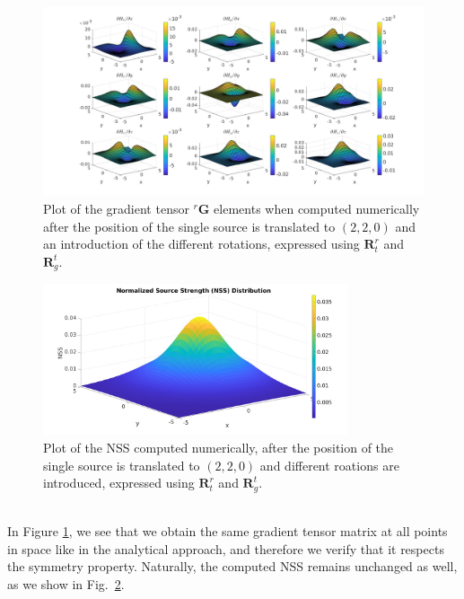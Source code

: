 \documentclass[main]{subfiles}
\begin{document}
\begin{figure}
\centering
\hspace*{-0.2\textwidth}
\includegraphics[width=1.4\textwidth]{images/gradients_rotated_single_num.jpg}
\caption{Plot of the gradient tensor ${}^r \mathbf{G}$ elements
when computed numerically after the position of the single source is translated to $(2,2,0)$ and an 
introduction of the different rotations, expressed using $\mathbf{R}^r_t$ and $\mathbf{R}_g^t$.}
\label{fig:gradients_rotated_single_num}
\end{figure}
\begin{figure}
\centering
\includegraphics[width=0.8\textwidth]{images/NSS_rotated_single_num.jpg}
\caption{Plot of the NSS computed numerically, after the position of the single source is translated to $(2,2,0)$ and 
different roations are introduced, expressed using $\mathbf{R}^r_t$ and $\mathbf{R}_g^t$.}
\label{fig:NSS_rotated_single_num}
\end{figure}

\noindent\\
In Figure \ref{fig:gradients_rotated_single_num}, we see that we obtain the same 
gradient tensor matrix at all points in space like in the analytical approach, and therefore 
we verify that it respects the symmetry property.
Naturally, the computed NSS remains unchanged as well, as we show in Fig.~\ref{fig:NSS_rotated_single_num}.
\end{document}
